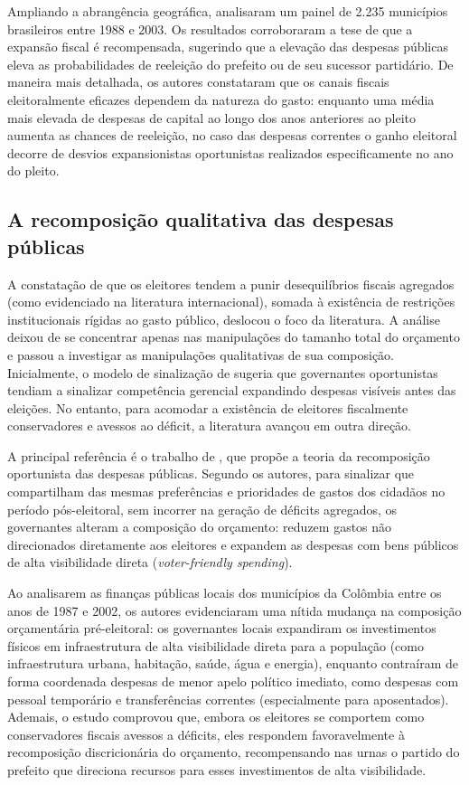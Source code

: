 Ampliando a abrangência geográfica, \textcite{sakurai2008} analisaram um painel de 2.235 municípios brasileiros entre 1988 e 2003. Os resultados corroboraram a tese de que a expansão fiscal é recompensada, sugerindo que a elevação das despesas públicas eleva as probabilidades de reeleição do prefeito ou de seu sucessor partidário. De maneira mais detalhada, os autores constataram que os canais fiscais eleitoralmente eficazes dependem da natureza do gasto: enquanto uma média mais elevada de despesas de capital ao longo dos anos anteriores ao pleito aumenta as chances de reeleição, no caso das despesas correntes o ganho eleitoral decorre de desvios expansionistas oportunistas realizados especificamente no ano do pleito.

\subsection{A recomposição qualitativa das despesas públicas}

A constatação de que os eleitores tendem a punir desequilíbrios fiscais agregados (como evidenciado na literatura internacional), somada à existência de restrições institucionais rígidas ao gasto público, deslocou o foco da literatura. A análise deixou de se concentrar apenas nas manipulações do tamanho total do orçamento e passou a investigar as manipulações qualitativas de sua composição. Inicialmente, o modelo de sinalização de \textcite{rogoff1990} sugeria que governantes oportunistas tendiam a sinalizar competência gerencial expandindo despesas visíveis antes das eleições. No entanto, para acomodar a existência de eleitores fiscalmente conservadores e avessos ao déficit, a literatura avançou em outra direção.

A principal referência é o trabalho de \textcite{drazen2010}, que propõe a teoria da recomposição oportunista das despesas públicas. Segundo os autores, para sinalizar que compartilham das mesmas preferências e prioridades de gastos dos cidadãos no período pós-eleitoral, sem incorrer na geração de déficits agregados, os governantes alteram a composição do orçamento: reduzem gastos não direcionados diretamente aos eleitores e expandem as despesas com bens públicos de alta visibilidade direta (\textit{voter-friendly spending}).

Ao analisarem as finanças públicas locais dos municípios da Colômbia entre os anos de 1987 e 2002, os autores evidenciaram uma nítida mudança na composição orçamentária pré-eleitoral: os governantes locais expandiram os investimentos físicos em infraestrutura de alta visibilidade direta para a população (como infraestrutura urbana, habitação, saúde, água e energia), enquanto contraíram de forma coordenada despesas de menor apelo político imediato, como despesas com pessoal temporário e transferências correntes (especialmente para aposentados). Ademais, o estudo comprovou que, embora os eleitores se comportem como conservadores fiscais avessos a déficits, eles respondem favoravelmente à recomposição discricionária do orçamento, recompensando nas urnas o partido do prefeito que direciona recursos para esses investimentos de alta visibilidade.

